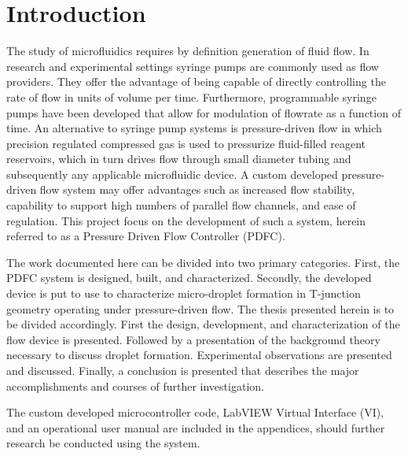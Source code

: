 \chapter{Introduction}

The study of microfluidics requires by definition generation of fluid flow. In research and experimental settings syringe pumps are commonly used as flow providers\cite{Christopher2008}. They offer the advantage of being capable of directly controlling the rate of flow in units of volume per time. Furthermore, programmable syringe pumps have been developed that allow for modulation of flowrate as a function of time. An alternative to syringe pump systems is pressure-driven flow in which precision regulated compressed gas is used to pressurize fluid-filled reagent reservoirs, which in turn drives flow through small diameter tubing and subsequently any applicable microfluidic device. A custom developed pressure-driven flow system may offer advantages such as increased flow stability, capability to support high numbers of parallel flow channels, and ease of regulation. This project focus on the development of such a system, herein referred to as a Pressure Driven Flow Controller (PDFC). 

The work documented here can be divided into two primary categories. First, the PDFC system is designed, built, and characterized. Secondly, the developed device is put to use to characterize micro-droplet formation in T-junction geometry operating under pressure-driven flow. The thesis presented herein is to be divided accordingly. First the design, development, and characterization of the flow device is presented. Followed by a presentation of the background theory necessary to discuss droplet formation. Experimental observations are presented and discussed. Finally, a conclusion is presented that describes the major accomplishments and courses of further investigation.

The custom developed microcontroller code, LabVIEW Virtual Interface (VI), and an operational user manual are included in the appendices, should further research be conducted using the system.